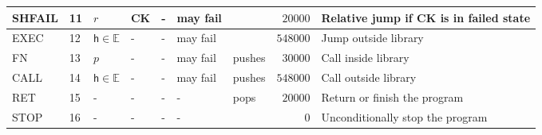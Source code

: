 \documentclass[9pt,oneside]{amsart}
\begin{document}
\begin{table}[h]
\begin{tabular}{l p{1cm} l p{1cm} p{1cm} p{1.5cm} p{1cm} r p{5cm}}
SHFAIL	&11	&$r$	&\textbf{CK}	&-                              &may fail	&		&$20000$  &Relative jump if \textbf{CK} is in failed state \\ \midrule
EXEC	&12	&$\mathsf{h} \in \mathbb{E}$ &-	&-                              &may fail	& 	    &$548000$ &Jump outside library \\ \midrule
FN  	&13	&$p$	&-		        &-                              &may fail	&pushes &$30000$  &Call inside library \\ \midrule
CALL	&14	&$\mathsf{h} \in \mathbb{E}$	&-		        &-                              &may fail	&pushes	&$548000$ &Call outside library \\ \midrule
RET 	&15	&-  	&-		        &-                              &-	      	&pops   &$20000$  &Return or finish the program \\ \midrule
STOP	&16	&-  	&-		        &-                              &-	      	&       &$0$      &Unconditionally stop the program \\
\bottomrule
\end{tabular}
\end{table}



\newpage
\end{document}
